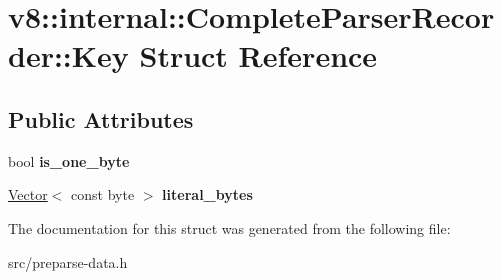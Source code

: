 \hypertarget{structv8_1_1internal_1_1_complete_parser_recorder_1_1_key}{}\section{v8\+:\+:internal\+:\+:Complete\+Parser\+Recorder\+:\+:Key Struct Reference}
\label{structv8_1_1internal_1_1_complete_parser_recorder_1_1_key}
\subsection*{Public Attributes}
\begin{DoxyCompactItemize}
\item 
\hypertarget{structv8_1_1internal_1_1_complete_parser_recorder_1_1_key_a4b2dc1307041b63a07f222bf7ab28855}{}bool {\bfseries is\+\_\+one\+\_\+byte}\label{structv8_1_1internal_1_1_complete_parser_recorder_1_1_key_a4b2dc1307041b63a07f222bf7ab28855}

\item 
\hypertarget{structv8_1_1internal_1_1_complete_parser_recorder_1_1_key_a25cf6b18414e40a8620246c6ad6fdce6}{}\hyperlink{classv8_1_1internal_1_1_vector}{Vector}$<$ const byte $>$ {\bfseries literal\+\_\+bytes}\label{structv8_1_1internal_1_1_complete_parser_recorder_1_1_key_a25cf6b18414e40a8620246c6ad6fdce6}

\end{DoxyCompactItemize}


The documentation for this struct was generated from the following file\+:\begin{DoxyCompactItemize}
\item 
src/preparse-\/data.\+h\end{DoxyCompactItemize}
